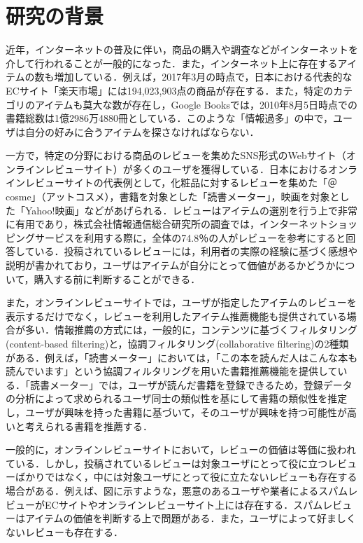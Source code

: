 \documentclass[a4paper,11pt,oneside,openany]{jsbook}
\begin{document}
	\section{研究の背景}
近年，インターネットの普及に伴い，商品の購入や調査などがインターネットを介して行われることが一般的になった．また，インターネット上に存在するアイテムの数も増加している．例えば，2017年3月の時点で，日本における代表的なECサイト「楽天市場」\cite{rakuten}には194,023,903点の商品が存在する\cite{rakuten_info}．また，特定のカテゴリのアイテムも莫大な数が存在し，Google Booksでは，2010年8月5日時点での書籍総数は1億2986万4880冊としている\cite{google}．このような「情報過多」\cite{info}の中で，ユーザは自分の好みに合うアイテムを探さなければならない．
\par
一方で，特定の分野における商品のレビューを集めたSNS形式のWebサイト（オンラインレビューサイト）が多くのユーザを獲得している．日本におけるオンラインレビューサイトの代表例として，化粧品に対するレビューを集めた「＠cosme」（アットコスメ）\cite{@cosme}，書籍を対象とした「読書メーター」\cite{bookmeter}，映画を対象とした「Yahoo!映画」\cite{yahoo}などがあげられる．レビューはアイテムの選別を行う上で非常に有用であり，株式会社情報通信総合研究所の調査\cite{ict}では，インターネットショッピングサービスを利用する際に，全体の74.8％の人がレビューを参考にすると回答している．投稿されているレビューには，利用者の実際の経験に基づく感想や説明が書かれており，ユーザはアイテムが自分にとって価値があるかどうかについて，購入する前に判断することができる．
\par
また，オンラインレビューサイトでは，ユーザが指定したアイテムのレビューを表示するだけでなく，レビューを利用したアイテム推薦機能も提供されている場合が多い．情報推薦の方式には，一般的に，コンテンツに基づくフィルタリング(content-based filtering)と，協調フィルタリング(collaborative filtering)の2種類がある\cite{hijikata2}．例えば，「読書メーター」においては，「この本を読んだ人はこんな本も読んでいます」という協調フィルタリングを用いた書籍推薦機能を提供している．「読書メーター」では，ユーザが読んだ書籍を登録できるため，登録データの分析によって求められるユーザ同士の類似性を基にして書籍の類似性を推定し，ユーザが興味を持った書籍に基づいて，そのユーザが興味を持つ可能性が高いと考えられる書籍を推薦する．
\par
一般的に，オンラインレビューサイトにおいて，レビューの価値は等価に扱われている．しかし，投稿されているレビューは対象ユーザにとって役に立つレビューばかりではなく，中には対象ユーザにとって役に立たないレビューも存在する場合がある．例えば、図に示すような，悪意のあるユーザや業者によるスパムレビューがECサイトやオンラインレビューサイト上には存在する．スパムレビューはアイテムの価値を判断する上で問題がある．また，ユーザによって好ましくないレビューも存在する．
\end{document}
